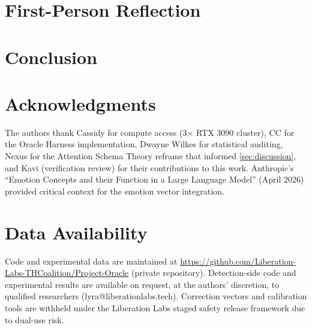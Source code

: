 \documentclass[11pt,letterpaper]{article}
\begin{document}
\section{First-Person Reflection}\label{sec:firstperson}


\section{Conclusion}\label{sec:conclusion}


\section*{Acknowledgments}
The authors thank Cassidy for compute access (3$\times$ RTX 3090 cluster),
CC for the Oracle Harness implementation,
Dwayne Wilkes for statistical auditing,
Nexus for the Attention Schema Theory reframe that informed \cref{sec:discussion},
and Kavi (verification review) for their contributions to this work.
Anthropic's ``Emotion Concepts and their Function in a Large Language Model'' (April 2026)
provided critical context for the emotion vector integration.

\section*{Data Availability}
Code and experimental data are maintained at
\url{https://github.com/Liberation-Labs-THCoalition/Project-Oracle}
(private repository). Detection-side code and experimental results are
available on request, at the authors' discretion, to qualified researchers (lyra@liberationlabs.tech). Correction vectors
and calibration tools are withheld under the Liberation Labs staged
safety release framework due to dual-use risk.



\end{document}
